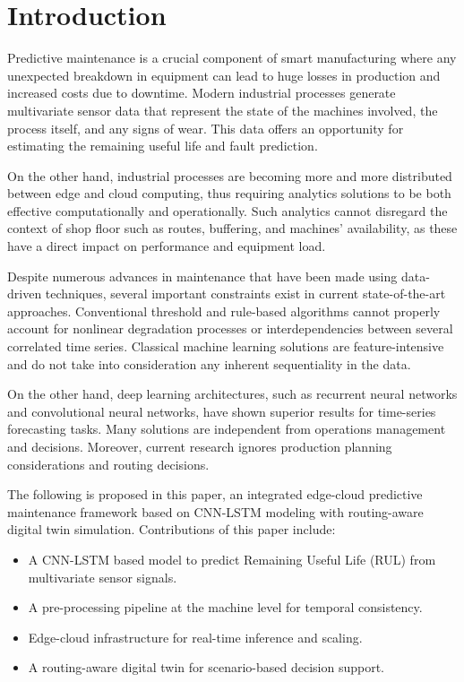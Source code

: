 \documentclass[conference]{IEEEtran}
\begin{document}
\section{Introduction}

Predictive maintenance is a crucial component of smart manufacturing where any unexpected breakdown in equipment can lead to huge losses in production and increased costs due to downtime. Modern industrial processes generate multivariate sensor data that represent the state of the machines involved, the process itself, and any signs of wear. This data offers an opportunity for estimating the remaining useful life and fault prediction.

On the other hand, industrial processes are becoming more and more distributed between edge and cloud computing, thus requiring analytics solutions to be both effective computationally and operationally. Such analytics cannot disregard the context of shop floor such as routes, buffering, and machines' availability, as these have a direct impact on performance and equipment load.

Despite numerous advances in maintenance that have been made using data-driven techniques, several important constraints exist in current state-of-the-art approaches. Conventional threshold and rule-based algorithms cannot properly account for nonlinear degradation processes or interdependencies between several correlated time series. Classical machine learning solutions are feature-intensive and do not take into consideration any inherent sequentiality in the data.

On the other hand, deep learning architectures, such as recurrent neural networks and convolutional neural networks, have shown superior results for time-series forecasting tasks. Many solutions are independent from operations management and decisions. Moreover, current research ignores production planning considerations and routing decisions.

The following is proposed in this paper, an integrated edge-cloud predictive maintenance framework based on CNN-LSTM modeling with routing-aware digital twin simulation. Contributions of this paper include:
\begin{itemize}
  \item A CNN-LSTM based model to predict Remaining Useful Life (RUL) from multivariate sensor signals.
  \item A pre-processing pipeline at the machine level for temporal consistency.
  \item Edge-cloud infrastructure for real-time inference and scaling.
  \item A routing-aware digital twin for scenario-based decision support.
\end{itemize}
\end{document}
